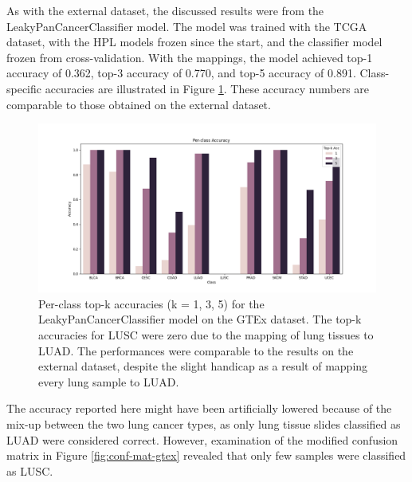\documentclass{l4proj}
\begin{document}
As with the external dataset, the discussed results were from the LeakyPanCancerClassifier model. The model was trained with the TCGA dataset, with the HPL models frozen since the start, and the classifier model frozen from cross-validation. With the mappings, the model achieved top-1 accuracy of 0.362, top-3 accuracy of 0.770, and top-5 accuracy of 0.891. Class-specific accuracies are illustrated in Figure \ref{fig:class-acc-gtex}. These accuracy numbers are comparable to those obtained on the external dataset.

\begin{figure}[h]
    \centering
    \includegraphics[width=1\linewidth]{images/gtexacc.png}
    \caption{Per-class top-k accuracies (k = 1, 3, 5) for the LeakyPanCancerClassifier model on the GTEx dataset. The top-k accuracies for LUSC were zero due to the mapping of lung tissues to LUAD. The performances were comparable to the results on the external dataset, despite the slight handicap as a result of mapping every lung sample to LUAD.}
    \label{fig:class-acc-gtex}
\end{figure}

The accuracy reported here might have been artificially lowered because of the mix-up between the two lung cancer types, as only lung tissue slides classified as LUAD were considered correct. However, examination of the modified confusion matrix in Figure \ref{fig:conf-mat-gtex} revealed that only few samples were classified as LUSC.
\end{document}
